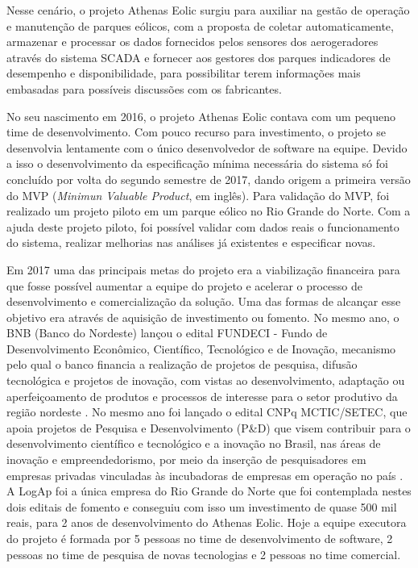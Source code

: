 Nesse cenário, o projeto Athenas Eolic surgiu para auxiliar na gestão de operação e manutenção de parques eólicos, com a proposta de coletar automaticamente, armazenar e processar os dados fornecidos pelos sensores dos aerogeradores através do sistema SCADA e fornecer aos gestores dos parques indicadores de desempenho e disponibilidade, para possibilitar terem informações mais embasadas para possíveis discussões com os fabricantes. 

No seu nascimento em 2016, o projeto Athenas Eolic contava com um pequeno time de desenvolvimento. Com pouco recurso para investimento, o projeto se desenvolvia lentamente com o único desenvolvedor de software na equipe. Devido a isso o desenvolvimento da especificação mínima necessária do sistema só foi concluído por volta do segundo semestre de 2017, dando origem a primeira versão do MVP (\textit{Minimun Valuable Product}, em inglês). Para validação do MVP, foi realizado um projeto piloto em um parque eólico no Rio Grande do Norte. Com a ajuda deste projeto piloto, foi possível validar com dados reais o funcionamento do sistema, realizar melhorias nas análises já existentes e especificar novas.

Em 2017 uma das principais metas do projeto era a viabilização financeira para que fosse possível aumentar a equipe do projeto e acelerar o processo de desenvolvimento e comercialização da solução. Uma das formas de alcançar esse objetivo era através de aquisição de investimento ou fomento. No mesmo ano, o BNB (Banco do Nordeste) lançou o edital FUNDECI - Fundo de Desenvolvimento Econômico, Científico, Tecnológico e de Inovação, mecanismo pelo qual o banco financia a realização de projetos de pesquisa, difusão tecnológica e projetos de inovação, com vistas ao desenvolvimento, adaptação ou aperfeiçoamento de produtos e processos de interesse para o setor produtivo da região nordeste \cite{bnb-fundeci}. No mesmo ano foi lançado o edital CNPq MCTIC/SETEC, que apoia projetos de Pesquisa e Desenvolvimento (P\&D) que visem contribuir para o desenvolvimento científico e tecnológico e a inovação no Brasil, nas áreas de inovação e empreendedorismo, por meio da inserção de pesquisadores em empresas privadas vinculadas às incubadoras de empresas em operação no país \cite{cnpq-mctic}. A LogAp foi a única empresa do Rio Grande do Norte que foi contemplada nestes dois editais de fomento e conseguiu com isso um investimento de quase 500 mil reais, para 2 anos de desenvolvimento do Athenas Eolic. Hoje a equipe executora do projeto é formada por 5 pessoas no time de desenvolvimento de software, 2 pessoas no time de pesquisa de novas tecnologias e 2 pessoas no time comercial.

